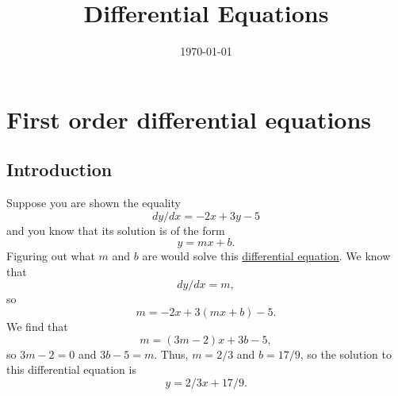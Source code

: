 \documentclass[11pt, oneside]{article}   	%
\title{Differential Equations}
\date{\today}							%
\begin{document}
\maketitle
\tableofcontents
\section{First order differential equations}
\subsection{Introduction}
Suppose you are shown the equality
$$
dy/dx = -2x + 3y - 5
$$
and you know that its solution is of the form
$$
y = mx + b.
$$
Figuring out what $m$ and $b$ are would solve this \underline{differential equation}. We know that
$$
dy/dx = m,
$$
so
$$
m = -2x + 3(mx+b)-5.
$$ 
We find that 
$$
m = (3m -2)x + 3b - 5,
$$
so $3m - 2 = 0$ and $3b-5=m$. Thus, $m = 2/3$ and $b = 17 / 9$, so the solution to this differential equation is
$$
y = 2/3 x + 17 / 9.
$$
\end{document}
